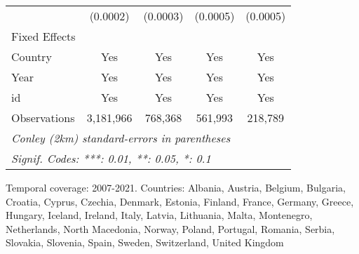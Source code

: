 \begin{table}[htbp]
\begin{tabular}{lcccc}
                            & (0.0002)              & (0.0003)      & (0.0005)                            & (0.0005)\\   
      Fixed Effects\\
      Country               & Yes                   & Yes           & Yes                                 & Yes\\  
      Year                  & Yes                   & Yes           & Yes                                 & Yes\\  
      id                    & Yes                   & Yes           & Yes                                 & Yes\\  
      \midrule 
      Observations          & 3,181,966             & 768,368       & 561,993                             & 218,789\\  
      \midrule \midrule
      \multicolumn{5}{l}{\emph{Conley (2km) standard-errors in parentheses}}\\
      \multicolumn{5}{l}{\emph{Signif. Codes: ***: 0.01, **: 0.05, *: 0.1}}\\
   \end{tabular}
   
   \par \raggedright 
   Temporal coverage: 2007-2021. Countries: Albania, Austria, Belgium, Bulgaria, Croatia, Cyprus, Czechia, Denmark, Estonia, Finland, France, Germany, Greece, Hungary, Iceland, Ireland, Italy, Latvia, Lithuania, Malta, Montenegro, Netherlands, North Macedonia, Norway, Poland, Portugal, Romania, Serbia, Slovakia, Slovenia, Spain, Sweden, Switzerland, United Kingdom
\end{table}


